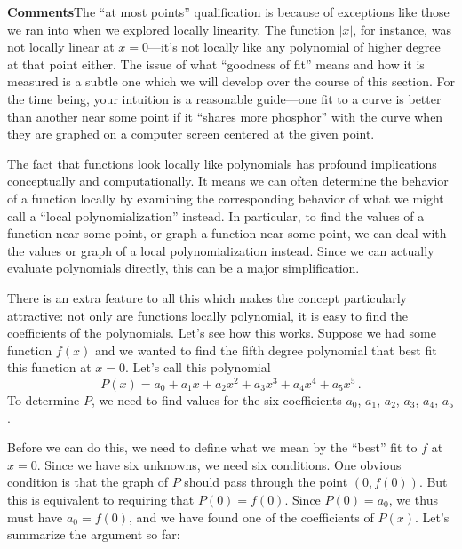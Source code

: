 {{{{\noindent
\begin{center}
\end{center}




{\bf Comments}\quad The ``at most points'' qualification is because of exceptions like those we ran into when we explored locally linearity.  The function $|x|$, for instance, was not locally linear at $x=0$---it's not locally like any polynomial of higher degree at that point either.   The issue of what ``goodness of fit'' means and how it is measured is a subtle one which we will develop over the course of this section.  For the time being, your intuition is a reasonable guide---one fit to a curve is better than another near some point if it ``shares more phosphor'' with the curve when they are graphed on a computer screen centered at the given point.

The fact that functions look locally like polynomials has profound implications conceptually and 
computationally.  It means we can often determine the behavior of a
function locally by examining the corresponding behavior of what we
might call a ``local polynomialization'' instead.  In particular, to find the values of a function near some point, or graph a function near some point, we can deal with the values or graph of a local polynomialization instead.  Since we can actually evaluate polynomials directly, this can be a major simplification.

There is an extra feature to all this which makes the concept particularly attractive:  not only are functions locally polynomial, it is easy to find the coefficients of the polynomials.  Let's see how this works.  Suppose we had some function $f(x)$ and we
 wanted to find the fifth degree polynomial that best
 fit this function at $x=0$.  Let's call this polynomial
\[
P(x) = a_0+a_1x+a_2x^2+a_3x^3+a_4x^4+a_5x^5 \, .
\]
To determine $P$, we need to find values for the six coefficients $a_0$, $a_1$, $a_2$, $a_3$, $a_4$, $a_5$.  

Before we can do this, we need to define what we mean by the ``best'' fit to $f$ at $x=0$.  Since we have six unknowns, we need six conditions.  One obvious 
condition is that the graph of $P$ should pass through the point $(0, f(0))$. 
 But this is equivalent to requiring that $P(0)=f(0)$.  Since $P(0)=a_0$, we thus must have $a_0=f(0)$, and we have found one of the coefficients of $P(x)$.  Let's summarize the argument so far:

}}}}
